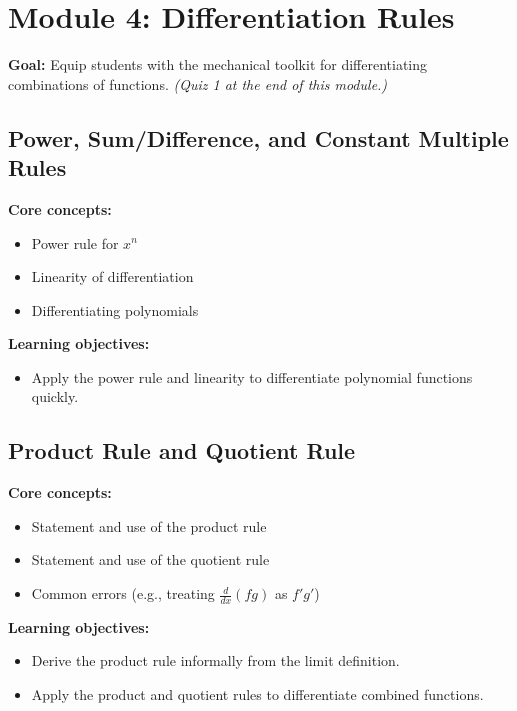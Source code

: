 \documentclass{article}
\begin{document}
\section{Module 4: Differentiation Rules}
\textbf{Goal:} Equip students with the mechanical toolkit for differentiating combinations of functions. \textit{(Quiz 1 at the end of this module.)}

\subsection{Power, Sum/Difference, and Constant Multiple Rules}
\textbf{Core concepts:}
\begin{itemize}[leftmargin=*]
  \item Power rule for $x^n$
  \item Linearity of differentiation
  \item Differentiating polynomials
\end{itemize}
\textbf{Learning objectives:}
\begin{itemize}[leftmargin=*]
  \item Apply the power rule and linearity to differentiate polynomial functions quickly.
\end{itemize}

\subsection{Product Rule and Quotient Rule}
\textbf{Core concepts:}
\begin{itemize}[leftmargin=*]
  \item Statement and use of the product rule
  \item Statement and use of the quotient rule
  \item Common errors (e.g., treating $\frac{d}{dx}(fg)$ as $f'g'$)
\end{itemize}
\textbf{Learning objectives:}
\begin{itemize}[leftmargin=*]
  \item Derive the product rule informally from the limit definition.
  \item Apply the product and quotient rules to differentiate combined functions.
\end{itemize}
\end{document}
